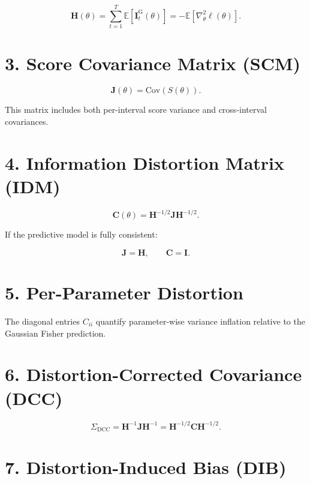 \documentclass[11pt]{article}
\begin{document}
\begin{equation}
\mathbf H(\theta)
=
\sum_{t=1}^T \mathbb{E}\!\left[\mathbf I_t^{\mathrm{G}}(\theta)\right]
=
- \mathbb{E}\!\left[\nabla_\theta^2 \ell(\theta)\right].
\end{equation}

\section*{3. Score Covariance Matrix (SCM)}

\begin{equation}
\mathbf J(\theta)
=
\mathrm{Cov}\!\left(S(\theta)\right).
\end{equation}

This matrix includes both per-interval score variance and cross-interval covariances.

\section*{4. Information Distortion Matrix (IDM)}

\begin{equation}
\mathbf C(\theta)
=
\mathbf H^{-1/2}
\mathbf J
\mathbf H^{-1/2}.
\end{equation}

If the predictive model is fully consistent:

\begin{equation}
\mathbf J = \mathbf H,
\qquad
\mathbf C = \mathbf I.
\end{equation}

\section*{5. Per-Parameter Distortion}

The diagonal entries $C_{ii}$ quantify parameter-wise variance inflation relative to the Gaussian Fisher prediction.

\section*{6. Distortion-Corrected Covariance (DCC)}

\begin{equation}
\Sigma_{\mathrm{DCC}}
=
\mathbf H^{-1}
\mathbf J
\mathbf H^{-1}
=
\mathbf H^{-1/2}
\mathbf C
\mathbf H^{-1/2}.
\end{equation}

\section*{7. Distortion-Induced Bias (DIB)}
\end{document}
